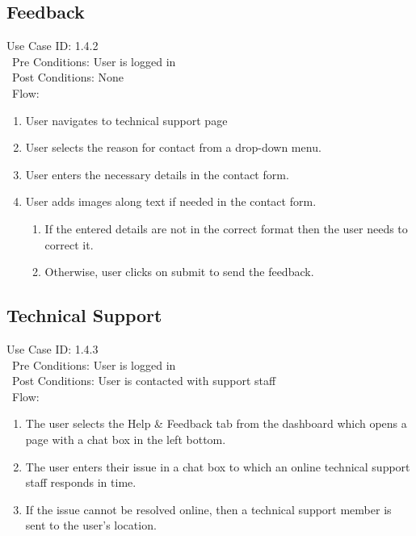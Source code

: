 \subsection{Feedback} 
Use Case ID: 1.4.2\\\
Pre Conditions: User is logged in\\\
Post Conditions: None\\\
Flow: 
\begin{enumerate}
    \item User navigates to technical support page
    \item User selects the reason for contact from a drop-down menu.
    \item User enters the necessary details in the contact form.
    \item User adds images along text if needed in the contact form.
    \begin{enumerate}
        \item If the entered details are not in the correct format then the user needs to correct it.
        \item Otherwise, user clicks on submit to send the feedback.
    \end{enumerate}
\end{enumerate}
\subsection{Technical Support} 
Use Case ID: 1.4.3\\\
Pre Conditions: User is logged in\\\
Post Conditions: User is contacted with support staff\\\
Flow: 
\begin{enumerate}
    \item The user selects the Help \& Feedback tab from the dashboard which opens a page with a chat box in the left bottom.
    \item The user enters their issue in a chat box to which an online technical support staff responds in time. 
    \item If the issue cannot be resolved online, then a technical support member is sent to the user's location.
\end{enumerate}

